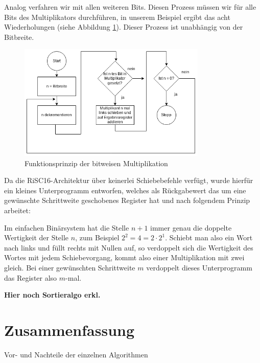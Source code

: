 \documentclass[fleqn, a4paper, 11pt]{article}       %
\begin{document}
Analog verfahren wir mit allen weiteren Bits. Diesen Prozess müssen wir für alle Bits des Multiplikators durchführen, in unserem Beispiel ergibt das acht Wiederholungen (siehe Abbildung \ref{fig:bitw_Mul_Prinzip}). Dieser Prozess ist unabhängig von der Bitbreite.



\begin{figure}[h]
    \includegraphics[width =0.8\textwidth]{bitweise_Mul_Prinzip.png}
\caption{Funktionsprinzip der bitweisen Multiplikation}
\label{fig:bitw_Mul_Prinzip}
\end{figure}



Da die RiSC16-Architektur über keinerlei Schiebebefehle verfügt, wurde hierfür ein kleines Unterprogramm entworfen, welches als Rückgabewert das um eine gewünschte Schrittweite geschobenes Register hat und nach folgendem Prinzip arbeitet:

Im einfachen Binärsystem hat die Stelle $n+1$ immer genau die doppelte Wertigkeit der Stelle $n$, zum Beispiel $2^2 = 4 = 2 \cdot 2^1$. Schiebt man also ein Wort nach links und füllt rechts mit Nullen auf, so verdoppelt sich die Wertigkeit des Wortes mit jedem Schiebevorgang, kommt also einer Multiplikation mit zwei gleich. Bei einer gewünschten Schrittweite $m$ verdoppelt dieses Unterprogramm das Register also $m$-mal.

\textbf{Hier noch Sortieralgo erkl.}

\section{Zusammenfassung}

\begin{compactitem}
    \item Vor- und Nachteile der einzelnen Algorithmen
\end{compactitem}
\end{document}
